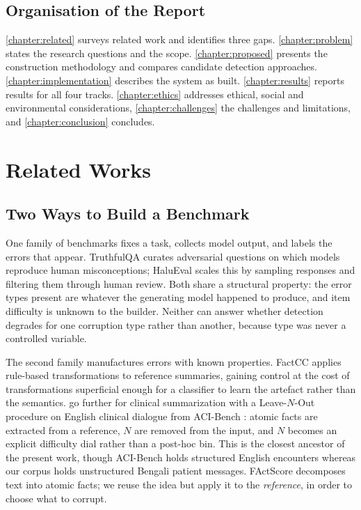 \documentclass{iutbscthesis}
\begin{document}
\section{Organisation of the Report}

\autoref{chapter:related} surveys related work and identifies three gaps. \autoref{chapter:problem} states the research questions and the scope. \autoref{chapter:proposed} presents the construction methodology and compares candidate detection approaches. \autoref{chapter:implementation} describes the system as built. \autoref{chapter:results} reports results for all four tracks. \autoref{chapter:ethics} addresses ethical, social and environmental considerations, \autoref{chapter:challenges} the challenges and limitations, and \autoref{chapter:conclusion} concludes.

\chapter{Related Works} \label{chapter:related}

\section{Two Ways to Build a Benchmark}

One family of benchmarks fixes a task, collects model output, and labels the errors that appear. TruthfulQA \parencite{lin2022truthfulqa} curates adversarial questions on which models reproduce human misconceptions; HaluEval \parencite{li2023halueval} scales this by sampling responses and filtering them through human review. Both share a structural property: the error types present are whatever the generating model happened to produce, and item difficulty is unknown to the builder. Neither can answer whether detection degrades for one corruption type rather than another, because type was never a controlled variable.

The second family manufactures errors with known properties. FactCC \parencite{kryscinski2020factcc} applies rule-based transformations to reference summaries, gaining control at the cost of transformations superficial enough for a classifier to learn the artefact rather than the semantics. \textcite{bn2025factcontrolled} go further for clinical summarization with a Leave-$N$-Out procedure on English clinical dialogue from ACI-Bench \parencite{yim2023acibench}: atomic facts are extracted from a reference, $N$ are removed from the input, and $N$ becomes an explicit difficulty dial rather than a post-hoc bin. This is the closest ancestor of the present work, though ACI-Bench holds structured English encounters whereas our corpus holds unstructured Bengali patient messages. FActScore \parencite{min2023factscore} decomposes text into atomic facts; we reuse the idea but apply it to the \emph{reference}, in order to choose what to corrupt.
\end{document}
